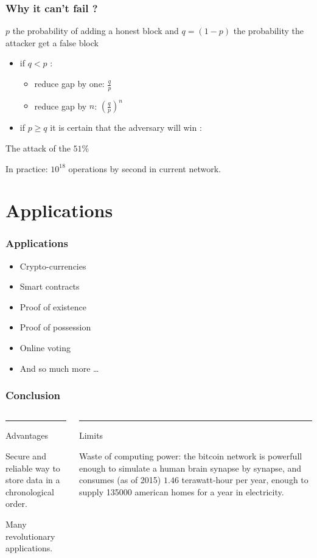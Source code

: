 \documentclass[12pt]{beamer}
\begin{document}
\begin{frame}
\frametitle{Why it can't fail ?}
$p$ the probability of adding a honest block and $q = (1-p)$ the probability the attacker get a false block
\begin{itemize}
\item if $q < p$ :
\begin{itemize}
\item reduce gap by one: $\frac{q}{p}$
\item reduce gap by $n$: $\left (\frac{q}{p}\right )^n$
\end{itemize}
\item if $p \ge q$ it is certain that the adversary will win : 
\end{itemize}
\begin{center}
\color{red!50!black} \large The attack of the $51\%$
\end{center}

In practice: $10^{18}$ operations by second in current network.

\end{frame}

\section{Applications}

\begin{frame}
    \frametitle{Applications}
    \begin{itemize}
        \item Crypto-currencies
        \item Smart contracts
        \item Proof of existence
        \item Proof of possession
        \item Online voting
        \item And so much more \ldots
    \end{itemize}
\end{frame}

\begin{frame}
\frametitle{Conclusion}
\begin{columns}[T]
        \begin{column}{.48\textwidth}
            {\color{blue}\rule{\linewidth}{4pt}
            Advantages}
            Secure and reliable way to
            store data in a chronological order.

            Many revolutionary applications.
        \end{column}
        \hfill
        \begin{column}{.48\linewidth}
            {\color{green!40!black}\rule{\linewidth}{4pt}
            Limits}
            Waste of computing power: the bitcoin network
            is powerfull enough to simulate a human brain synapse by synapse, and
            consumes (as of 2015) $1.46$ terawatt-hour per year, enough to supply
            135000 american homes for a year in electricity.
        \end{column}
    \end{columns}
\end{frame}
\end{document}
